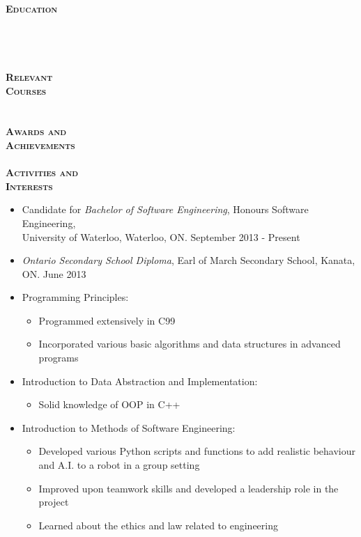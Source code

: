 \documentclass[12pt]{article}
\begin{document}
\begin{minipage}[t]{0.2\linewidth} 
	\textbf{\textsc{
	\hspace{-5pt}Education \\ \\ \\ \\ \\
	Relevant \\ Courses \\ \\ \\
	Awards and \\ Achievements \\ \\
	Activities and\\ Interests
	}}
\end{minipage}
\begin{minipage}[t]{0.8\linewidth} 
	\begin{itemize}
		\item Candidate for \textit{Bachelor of Software Engineering}, Honours Software Engineering, \\University of Waterloo, Waterloo, ON. September 2013 - Present
		\item \textit{Ontario Secondary School Diploma}, Earl of March Secondary School, Kanata, ON. June 2013
	\end{itemize} \vspace{12pt}
		
	\begin{itemize}
		\item Programming Principles:
			\begin{itemize}
				\item Programmed extensively in C99
				\item Incorporated various basic algorithms and data structures in advanced programs
			\end{itemize}
		\item Introduction to Data Abstraction and Implementation:
			\begin{itemize}
				\item Solid knowledge of OOP in C++
			\end{itemize}									
		\item Introduction to Methods of Software Engineering:
			\begin{itemize}
				\item Developed various Python scripts and functions to add realistic behaviour and A.I. to a	 								robot in a group setting
				\item Improved upon teamwork skills and developed a leadership role in the project 				
				\item Learned about the ethics and law related to engineering 
			\end{itemize}			
	\end{itemize} \vspace{12pt}
	

\end{minipage}
\end{document}
